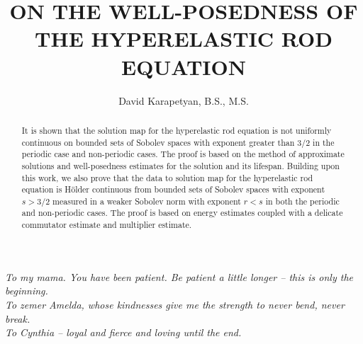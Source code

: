 \documentclass[final,noinfo]{nddiss2e}
\begin{document}
\frontmatter         %

\title{ON THE WELL-POSEDNESS OF THE HYPERELASTIC ROD EQUATION}            %
\author{David Karapetyan, B.S., M.S.}           %
\degprior{}         %

\maketitle           %

\makecopyright      %

\begin{abstract}
It is shown that the solution map for the hyperelastic rod equation is not
uniformly continuous on bounded sets of Sobolev spaces with exponent greater
than 3/2 in the periodic case and non-periodic cases. The proof is based on the
method of approximate solutions and well-posedness estimates for the solution
and its lifespan. Building upon this work, we also prove that the data to
solution map for the hyperelastic rod equation is H\"older continuous from
bounded sets of Sobolev spaces with exponent $s > 3/2$ measured in a weaker
Sobolev norm with exponent $r < s$ in both the periodic and non-periodic cases.
The proof is based on energy estimates coupled with a delicate commutator
estimate and multiplier estimate.
\end{abstract}

 \begin{dedication}
   \emph{To my mama. You have been patient. Be patient a little longer -- this is only the
   beginning.
   \\
To zemer Amelda, whose kindnesses
give me the strength to never bend, never break.
\\
To Cynthia -- loyal and fierce and loving until the end. 
}
  \end{dedication}
\end{document}
